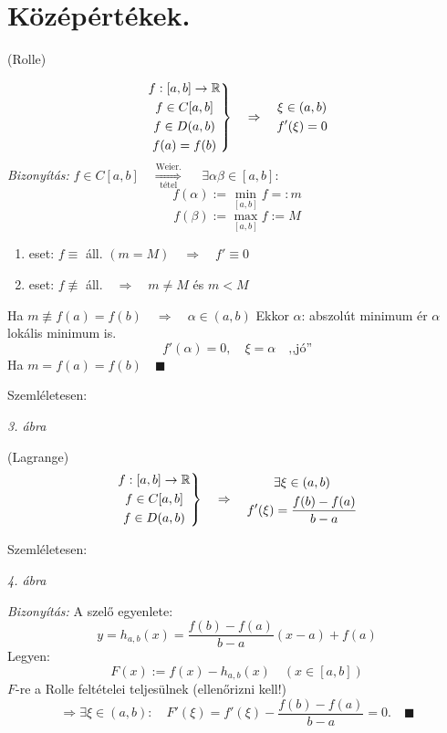 \documentclass[a4paper,11.5pt]{article}
\begin{document}
	\section{Középértékek.}
	\begin{theorem}
		(Rolle)
		
		\[\left.\begin{gathered}
			f:[a,b]\to\mathbb{R}\\
			f\in C[a,b]\\
			f\in D(a,b)\\
			f(a)=f(b)
		\end{gathered}\right\}\quad \Rightarrow\quad \begin{gathered}
		\xi\in (a,b)\\
		f'(\xi)=0
		\end{gathered}
		\]
		\textit{Bizonyítás:} $f\in C[a,b]\quad \overset{\text{Weier.}}{\underset{\text{tétel}}{\Longrightarrow}}\quad$
		$ \exists \alpha\beta\in[a,b]:\quad $
		\[ f(\alpha):=\min_{[a,b]}f=:m \]
		\[ f(\beta):= \max_{[a,b]}f:=M \]
		\begin{enumerate}
			\item eset: $f\equiv$ áll. $(m=M)\quad \Rightarrow\quad f'\equiv 0$
			\item eset: $f\not\equiv$ áll.$\quad \Rightarrow\quad m\not=M$ és $ m<M$
		\end{enumerate}
		Ha $m\not\equiv f(a)=f(b)\quad \Rightarrow\quad \alpha\in(a,b)$
		Ekkor $\alpha$: abszolút minimum ér $\alpha$ lokális minimum is.
		\[ f'(\alpha)=0,\quad \xi=\alpha\quad \text{,,jó''} \]
		Ha $m=f(a)=f(b)\quad \blacksquare$
	\end{theorem}
	Szemléletesen:
	\begin{center}
		\textit{3. ábra}
	\end{center}
	\begin{theorem}
		(Lagrange)
		\[ \left.\begin{gathered}
			f:[a,b]\to\mathbb{R}\\
			f\in C[a,b]\\
			f\in D(a,b)
		\end{gathered}\right\}\quad \Rightarrow\quad \begin{gathered}
			\exists \xi\in(a,b)\\
			f'(\xi)=\frac{f(b)-f(a)}{b-a}
		\end{gathered} \]
		
		Szemléletesen:
		\begin{center}
			\textit{4. ábra}
		\end{center}
		\textit{Bizonyítás:} A szelő egyenlete:
		\[ y=h_{a,b}(x)=\frac{f(b)-f(a)}{b-a}(x-a)+f(a) \]
		Legyen: \[ F(x):=f(x)-h_{a,b}(x)\quad (x\in[a,b]) \]
		$F$-re a Rolle feltételei teljesülnek (ellenőrizni kell!)
		\[ \Rightarrow \exists\xi\in(a,b):\quad F'(\xi)=f'(\xi)-\frac{f(b)-f(a)}{b-a}=0.\quad \blacksquare \]
	\end{theorem}
\end{document}
